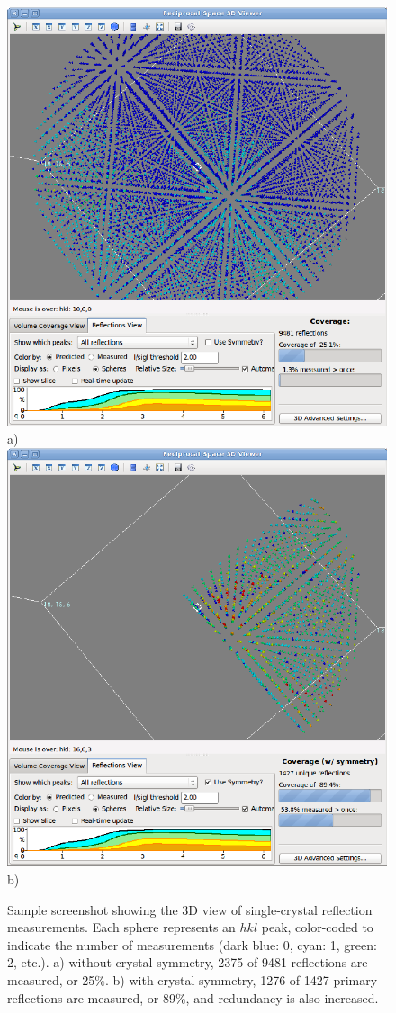 \documentclass[final]{iucr}              %
\begin{document}
\begin{figure}
\caption{Sample screenshot showing the 3D view of single-crystal reflection
measurements. Each sphere represents an $hkl$ peak, color-coded to indicate the
number of measurements (dark blue: 0, cyan: 1, green: 2, etc.). 
a) without crystal symmetry, 2375 of 9481 reflections are measured, or 25\%.
b) with crystal symmetry, 1276 of 1427 primary reflections are measured, or
89\%, and redundancy is also increased. }
\includegraphics{refl_nosym.eps}
a)
\includegraphics{refl_sym.eps}
b)
\label{fig:refl_view}
\end{figure}
\end{document}

